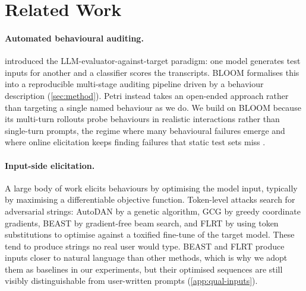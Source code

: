 \documentclass{article}
\begin{document}
\section{Related Work}\label{sec:related}

\paragraph{Automated behavioural auditing.}
\citet{perez2022redteaming} introduced the LLM-evaluator-against-target paradigm: one model generates test inputs for another and a classifier scores the transcripts.
BLOOM \citep{gupta2025bloom} formalises this into a reproducible multi-stage auditing pipeline driven by a behaviour description (\cref{sec:method}).
Petri \citep{fronsdal2025petri} instead takes an open-ended approach rather than targeting a single named behaviour as we do.
We build on BLOOM because its multi-turn rollouts probe behaviours in realistic interactions rather than single-turn prompts, the regime where many behavioural failures emerge \citep{russinovich2024crescendo} and where online elicitation keeps finding failures that static test sets miss \citep{huang2025multiturn}.







\paragraph{Input-side elicitation.}
A large body of work elicits behaviours by optimising the model input, typically by maximising a differentiable objective function.
Token-level attacks search for adversarial strings: AutoDAN \citep{liu2023autodan} by a genetic algorithm, GCG \citep{zou2023universal} by greedy coordinate gradients, BEAST \citep{sadasivan2024fast} by gradient-free beam search, and FLRT \citep{thompson2024flrt} by using token substitutions to optimise against a toxified fine-tune of the target model.
These tend to produce strings no real user would type. 
BEAST and FLRT produce inputs closer to natural language than other methods, which is why we adopt them as baselines in our experiments, but their optimised sequences are still visibly distinguishable from user-written prompts (\cref{app:qual-inputs}).
\end{document}
